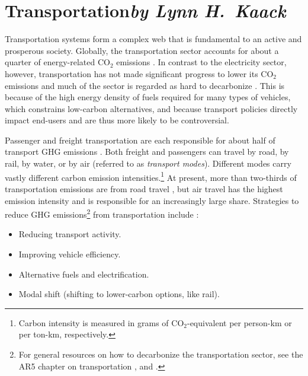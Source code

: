 \documentclass[11pt]{report}
\begin{document}
\section{Transportation\texorpdfstring{\hfill\textit{by Lynn H.~Kaack}}{}}
\label{sec:transportation}

Transportation systems form a complex web that is fundamental to an active and prosperous society. Globally, the transportation sector accounts for about a quarter of energy-related CO$_2$ emissions \cite{ipcc_global_2018}. 
In contrast to the electricity sector, however, transportation has not made significant progress to lower its CO$_2$ emissions \cite{Creutzig911} and much of the sector is regarded as hard to decarbonize \cite{Daviseaas9793}. This is because of the high energy density of fuels required for many types of vehicles, which constrains low-carbon alternatives, and because transport policies directly impact end-users and are thus more likely to be controversial.

Passenger and freight transportation are each responsible for about half of transport GHG emissions \cite{AR5_transport}. 
Both freight and passengers can travel by road, by rail, by water, or by air (referred to as \emph{transport modes}). Different modes carry vastly different carbon emission intensities.\footnote{Carbon intensity is measured in grams of CO$_2$-equivalent per person-km or per ton-km, respectively.}
At present, more than two-thirds of transportation emissions are from road travel \cite{AR5_transport}, but air travel has the highest emission intensity and is responsible for an increasingly large share.
Strategies to reduce GHG emissions\footnote{For general resources on how to decarbonize the transportation sector, see the AR5 chapter on transportation \cite{AR5_transport}, and \cite{figueroa2014energy, iea2017future, kaack2018decarbonizing}.} from transportation include \cite{AR5_transport}: 
\begin{itemize}
    \item Reducing transport activity.
    \item Improving vehicle efficiency.
    \item Alternative fuels and electrification.
    \item Modal shift (shifting to lower-carbon options, like rail).
\end{itemize}
\end{document}
